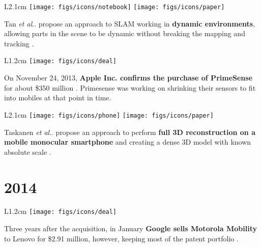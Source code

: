 \documentclass[12pt,a4paper]{article}
\makeatletter
\DeclareRobustCommand\onedot{\futurelet\@let@token\@onedot}
\def\@onedot{\ifx\@let@token.\else.\null\fi\xspace}
\def\etal{\emph{et al}\onedot}
\makeatother
\begin{document}
\vspace{0.1in}

\begin{wrapfigure}{L}{2.1cm}
	\vspace{-10pt}	
	\texttt{[image: figs/icons/notebook]}
	\texttt{[image: figs/icons/paper]}
	\vspace{-20pt}		
\end{wrapfigure} 
\noindent Tan \etal propose an approach to SLAM working in \textbf{dynamic environments}, allowing parts in the scene to be dynamic without breaking the mapping and tracking \cite{Tan13}.

\vspace{0.1in}

\begin{wrapfigure}{L}{1.2cm}
	\vspace{-0pt}	
	\texttt{[image: figs/icons/deal]}
	\vspace{-20pt}		
\end{wrapfigure} 
\noindent On November 24, 2013, \textbf{Apple Inc. confirms the purchase of PrimeSense} for about \$350 million . Primesense was working on shrinking their sensors to fit into mobiles at that point in time.

\vspace{0.1in}

\begin{wrapfigure}{L}{2.1cm}
	\vspace{-15pt}	
	\texttt{[image: figs/icons/phone]}
	\texttt{[image: figs/icons/paper]}
	\vspace{-25pt}		
\end{wrapfigure} 
\noindent Taskanen \etal propose an approach to perform \textbf{full 3D reconstruction on a mobile monocular smartphone} and creating a dense 3D model with known absolute scale \cite{Taskanen13}.

\vspace{-5pt}
\section*{2014}

\begin{wrapfigure}{L}{1.2cm}
	\vspace{-10pt}	
	\texttt{[image: figs/icons/deal]}
	\vspace{-20pt}		
\end{wrapfigure} 
Three years after the acquisition, in January \textbf{Google sells Motorola Mobility} to Lenovo for \$2.91 million, however, keeping most of the patent portfolio .
\end{document}

